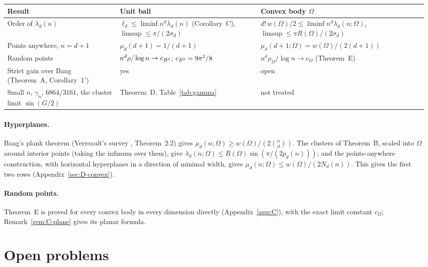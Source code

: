 \documentclass[11pt]{article}
\begin{document}
\begin{center}
\small
\begin{tabular}{p{3.4cm}p{5.2cm}p{5.6cm}}
\toprule
Result & Unit ball & Convex body $\Omega$\\
\midrule
Order of $\lambda_d(n)$ & $\ell_d\le\liminf n^d\lambda_d(n)$ (Corollary~C), $\limsup\le\pi/(2\sigma_d)$ &
$d!\,w(\Omega)/2\le\liminf n^d\lambda_d(n;\Omega)$, $\limsup\le\pi R(\Omega)/(2\sigma_d)$\\
Points anywhere, $n=d+1$ & $\mu_d(d+1)=1/(d+1)$ & $\mu_d(d+1;\Omega)=w(\Omega)/(2(d+1))$\\
Random points & $n^d\rho/\log n\to c_{B^d}$; $c_{B^2}=9\pi^2/8$ &
$n^d\rho_\Omega/\log n\to c_\Omega$ (Theorem~E)\\
Strict gain over Bang (Theorem~A, Corollary~1$'$) & yes & open\\
Small $n$, $\gamma_n$, $6864/3161$, the cluster limit $\sin(G/2)$ & Theorem~D, Table~\ref{tab:gamma} & not treated\\
\bottomrule
\end{tabular}
\end{center}

\paragraph{Hyperplanes.} Bang's plank theorem (Verreault's survey \cite{Verreault}, Theorem~2.2) gives
$\mu_d(n;\Omega)\ge w(\Omega)/(2\binom nd)$. The clusters of Theorem~B, scaled into $\Omega$ around interior
points (taking the infimum over them), give $\lambda_d(n;\Omega)\le R(\Omega)\sin(\pi/(2p_d(n)))$; and the
points-anywhere construction, with horizontal hyperplanes in a direction of minimal width, gives
$\mu_d(n;\Omega)\le w(\Omega)/(2N_d(n))$. This gives the first two rows (Appendix~\ref{sec:D-convex}).

\paragraph{Random points.} Theorem~E is proved for every convex body in every dimension directly
(Appendix~\ref{app:C}), with the exact limit constant $c_\Omega$; Remark~\ref{rem:C-plane} gives its planar formula.

\section{Open problems}\label{sec:open}
\end{document}
